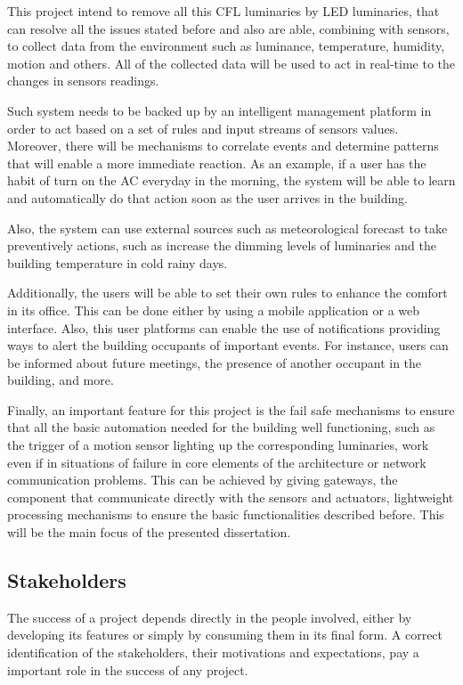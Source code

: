 This project intend to remove all this CFL luminaries by LED luminaries, that can resolve all the issues stated before and also are able, combining with sensors, to collect data from the environment such as luminance, temperature, humidity, motion and others. All of the collected data will be used to act in real-time to the changes in sensors readings. 

Such system needs to be backed up by an intelligent management platform in order to act based on a set of rules and input streams of sensors values. Moreover, there will be mechanisms to correlate events and determine patterns that will enable a more immediate reaction. As an example, if a user has the habit of turn on the AC everyday in the morning, the system will be able to learn and automatically do that action soon as the user arrives in the building. 

Also, the system can use external sources such as meteorological forecast to take preventively actions, such as increase the dimming levels of luminaries and the building temperature in cold rainy days.

Additionally, the users will be able to set their own rules to enhance the comfort in its office. This can be done either by using a mobile application or a web interface. Also, this user platforms can enable the use of notifications providing ways to alert the building occupants of important events. For instance, users can be informed about future meetings, the presence of another occupant in the building, and more.

Finally, an important feature for this project is the fail safe mechanisms to ensure that all the basic automation needed for the building well functioning, such as the trigger of a motion sensor lighting up the corresponding luminaries, work even if in situations of failure in core elements of the architecture or network communication problems. This can be achieved by giving gateways, the component that communicate directly with the sensors and actuators, lightweight processing mechanisms to ensure the basic functionalities described before. This will be the main focus of the presented dissertation.



\subsection{Stakeholders}
\label{Architecture:Stakeholders}

The success of a project depends directly in the people involved, either by developing its features or simply by consuming them in its final form. A correct identification of the stakeholders, their motivations and expectations, pay a important role in the success of any project. 

